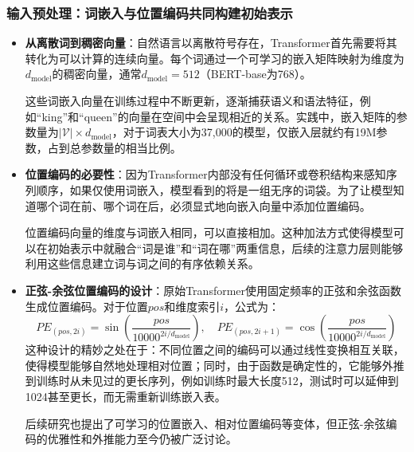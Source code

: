 \documentclass[11pt]{beamer}
\begin{document}
\begin{frame}
\frametitle{输入预处理：词嵌入与位置编码共同构建初始表示}
\begin{itemize}
    \item \textbf{从离散词到稠密向量}：自然语言以离散符号存在，Transformer首先需要将其转化为可以计算的连续向量。每个词通过一个\alert{可学习的嵌入矩阵}映射为维度为\(d_{\text{model}}\)的稠密向量，通常\(d_{\text{model}}=512\)（BERT-base为768）。
    
    这些词嵌入向量在训练过程中不断更新，逐渐捕获语义和语法特征，例如“king”和“queen”的向量在空间中会呈现相近的关系。实践中，嵌入矩阵的参数量为\(|\mathcal{V}| \times d_{\text{model}}\)，对于词表大小为37,000的模型，仅嵌入层就约有19M参数，占到总参数量的相当比例。

    \item \textbf{位置编码的必要性}：因为Transformer内部没有任何循环或卷积结构来感知序列顺序，如果仅使用词嵌入，模型看到的将是一组无序的词袋。为了让模型知道哪个词在前、哪个词在后，必须显式地向嵌入向量中添加\alert{位置编码}。
    
    位置编码向量的维度与词嵌入相同，可以直接相加。这种加法方式使得模型可以在初始表示中就融合“词是谁”和“词在哪”两重信息，后续的注意力层则能够利用这些信息建立词与词之间的有序依赖关系。

    \item \textbf{正弦-余弦位置编码的设计}：原始Transformer使用\alert{固定频率的正弦和余弦函数}生成位置编码。对于位置\(pos\)和维度索引\(i\)，公式为：
    \[
    PE_{(pos,2i)} = \sin\left(\frac{pos}{10000^{2i/d_{\text{model}}}}\right),\quad PE_{(pos,2i+1)} = \cos\left(\frac{pos}{10000^{2i/d_{\text{model}}}}\right)
    \]
    这种设计的精妙之处在于：不同位置之间的编码可以通过\alert{线性变换}相互关联，使得模型能够自然地处理相对位置；同时，由于函数是确定性的，它能够外推到训练时从未见过的更长序列，例如训练时最大长度512，测试时可以延伸到1024甚至更长，而无需重新训练嵌入表。
    
    后续研究也提出了可学习的位置嵌入、相对位置编码等变体，但正弦-余弦编码的优雅性和外推能力至今仍被广泛讨论。
\end{itemize}
\end{frame}
\end{document}
